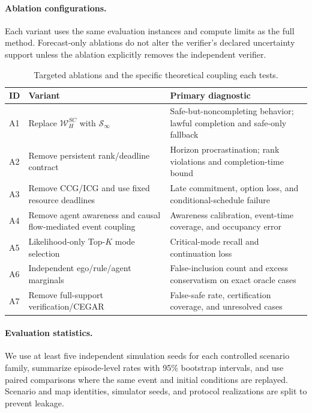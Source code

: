 \documentclass[letterpaper]{article} %
\begin{document}
\paragraph{Ablation configurations.}
Each variant uses the same evaluation instances and compute limits as the full method. Forecast-only ablations do not alter the verifier's declared uncertainty support unless the ablation explicitly removes the independent verifier.
\begin{table}[t]
\centering\small
\begin{tabular}{@{}p{}p{}p{}@{}}
\toprule
ID & Variant & Primary diagnostic\\
\midrule
A1 & Replace $\mathcal W_H^{SC}$ with $\mathcal S_\infty$ & Safe-but-noncompleting behavior; lawful completion and safe-only fallback\\
A2 & Remove persistent rank/deadline contract & Horizon procrastination; rank violations and completion-time bound\\
A3 & Remove CCG/ICG and use fixed resource deadlines & Late commitment, option loss, and conditional-schedule failure\\
A4 & Remove agent awareness and causal flow-mediated event coupling & Awareness calibration, event-time coverage, and occupancy error\\
A5 & Likelihood-only Top-$K$ mode selection & Critical-mode recall and continuation loss\\
A6 & Independent ego/rule/agent marginals & False-inclusion count and excess conservatism on exact oracle cases\\
A7 & Remove full-support verification/CEGAR & False-safe rate, certification coverage, and unresolved cases\\
\bottomrule
\end{tabular}
\caption{Targeted ablations and the specific theoretical coupling each tests.}
\label{tab:ablations}
\end{table}
\paragraph{Evaluation statistics.}
We use at least five independent simulation seeds for each controlled scenario family, summarize episode-level rates with 95\% bootstrap intervals, and use paired comparisons where the same event and initial conditions are replayed. Scenario and map identities, simulator seeds, and protocol realizations are split to prevent leakage.
\end{document}

